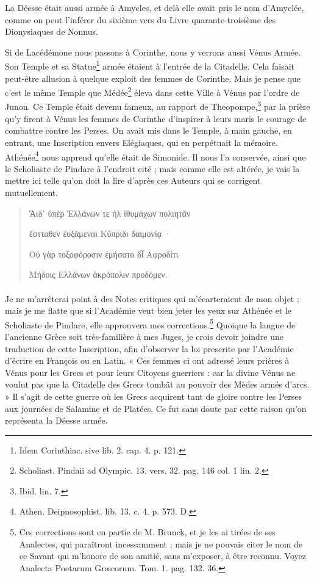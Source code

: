 \documentclass[a4paper, 18pt, oneside]{article}
\begin{document}
La Déesse était aussi armée à Amycles, et delà elle avait pris le nom d'Amyclée, comme on peut l'inférer du sixième vers du Livre quarante-troisième des Dionysiaques de Nonnus.

Si de Lacédémone nous passons à Corinthe, nous y verrons aussi Vénus Armée. Son Temple et sa Statue\footnote{Idem Corinthiac. sive lib. 2. cap. 4. p. 121.} armée étaient à l'entrée de la Citadelle. Cela faisait peut-être allusion à quelque exploit des femmes de Corinthe. Mais je pense que c'est le même Temple que Médée\footnote{Scholiast. Pindaii ad Olympic. 13. vers. 32. pag. 146 col. 1 lin. 2.} éleva dans cette Ville à Vénus par l'ordre de Junon. Ce Temple était devenu fameux, au rapport de Theopompe,\footnote{Ibid. lin. 7.} par la prière qu'y firent à Vénus les femmes de Corinthe d'inspirer à leurs maris le courage de combattre contre les Perses. On avait mis dans le Temple, à main gauche, en entrant, une Inscription envers Elégiaques, qui en perpétuait la mémoire. Athénée\footnote{Athen. Deipnosophist. lib. 13. c. 4. p. 573. D.} nous apprend qu'elle était de Simonide. Il nous l'a conservée, ainsi que le Scholiaste de Pindare à l'endroit cité ; mais comme elle est altérée, je vais la mettre ici telle qu'on doit la lire d'après ces Auteurs qui se corrigent mutuellement.
\begin{quotation}
Ἃιδ᾽ ὑπὲρ Ἑλλάνων τε ὴλ ἰθυμάχων πολιητᾶν

\hspace*{5mm}ἔστταθεν ἐυξάμεναι Κύπριδι δαιμονίᾳ ·

Οὐ γὰρ τοξοφόροσιν ἐμήσατο δἶ Αφροδίτι

\hspace*{5mm}Μήδοις Ελλάνων ἀκρόπολιν προδόμεν.    
\end{quotation}
\paragraph{}
Je ne m'arrêterai point à des Notes critiques qui m'écarteraient de mon objet ; mais je me flatte que si l'Académie veut bien jeter les yeux sur Athénée et le Scholiaste de Pindare, elle approuvera mes corrections.\footnote{Ces corrections sont en partie de M. Brunck, et je les ai tirées de ses Analectes, qui paraîtront incessamment ; mais je ne pouvais citer le nom de ce Savant qui m'honore de son amitié, sans m'exposer, à être reconnu. Voyez Analecta Poetarum Græcorum. Tom. 1. pag. 132. 36.} Quoique la langue de l'ancienne Grèce soit très-familière à mes Juges, je crois devoir joindre une traduction de cette Inscription, afin d'observer la loi prescrite par l'Académie d'écrire en François ou en Latin. « Ces femmes ci ont adressé leurs prières à Vénus pour les Grecs et pour leurs Citoyens guerriers : car la divine Vénus ne voulut pas que la Citadelle des Grecs tombât au pouvoir des Mèdes armés d'arcs. » Il s'agit de cette guerre où les Grecs acquirent tant de gloire contre les Perses aux journées de Salamine et de Platées. Ce fut sans doute par cette raison qu'on représenta la Déesse armée.
\end{document}
